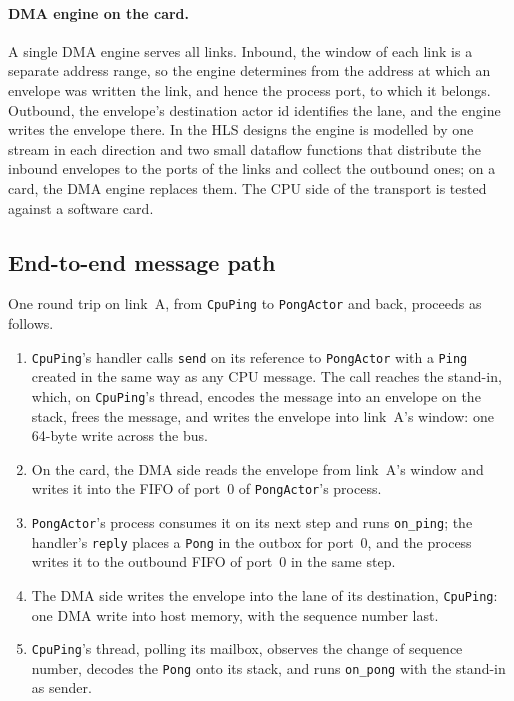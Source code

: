 \documentclass[11pt]{article}
\newcommand{\snd}{\texttt{send}}
\begin{document}
\paragraph{DMA engine on the card.} A single DMA engine serves all links. Inbound, the
window of each link is a separate address range, so the engine determines from
the address at which an envelope was written the link, and hence the process
port, to which it belongs. Outbound, the envelope's destination actor id
identifies the lane, and the engine writes the envelope there. In the HLS
designs the engine is modelled by one stream in each direction and two small
dataflow functions that distribute the inbound envelopes to the ports of the
links and collect the outbound ones; on a card, the DMA engine replaces them.
The CPU side of the transport is tested against a software card.

\subsection{End-to-end message path}
\label{sec:path}

One round trip on link~A, from \texttt{CpuPing} to \texttt{PongActor} and back,
proceeds as follows.

\begin{enumerate}[leftmargin=1.6em]
  \item \texttt{CpuPing}'s handler calls \snd{} on its reference to
  \texttt{PongActor} with a \texttt{Ping} created in the same way as any CPU
  message. The call reaches the stand-in, which, on \texttt{CpuPing}'s thread,
  encodes the message into an envelope on the stack, frees the message, and
  writes the envelope into link~A's window: one 64-byte write across the bus.
  \item On the card, the DMA side reads the envelope from link~A's window and
  writes it into the FIFO of port~0 of \texttt{PongActor}'s process.
  \item \texttt{PongActor}'s process consumes it on its next step and runs
  \texttt{on\_ping}; the handler's \texttt{reply} places a \texttt{Pong} in
  the outbox for port~0, and the process writes it to the outbound FIFO of
  port~0 in the same step.
  \item The DMA side writes the envelope into the lane of its destination,
  \texttt{CpuPing}: one DMA write into host memory, with the sequence number
  last.
  \item \texttt{CpuPing}'s thread, polling its mailbox, observes the change of
  sequence number, decodes the \texttt{Pong} onto its stack, and runs
  \texttt{on\_pong} with the stand-in as sender.
\end{enumerate}
\end{document}

